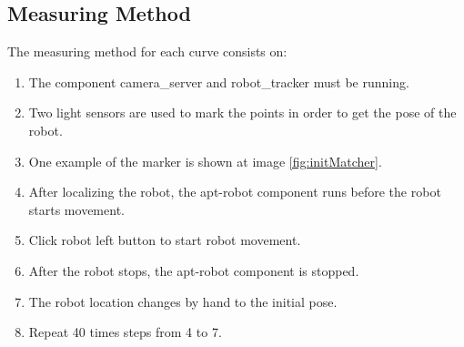\documentclass[10pt]{scrartcl}
\begin{document}
\subsection*{Measuring Method}

The measuring method for each curve consists on:
\begin{enumerate}
	\item The component camera\_server and robot\_tracker must be running.
	\item Two light sensors are used to mark the points in order to get the pose of the robot.
	\item One example of the marker is shown at image \ref{fig:initMatcher}.
	\item After localizing the robot, the apt-robot component runs before the robot starts movement.
	\item Click robot left button to start robot movement.
	\item After the robot stops, the apt-robot component is stopped.
	\item The robot location changes by hand to the initial pose.
	\item Repeat 40 times steps from 4 to 7.
\end{enumerate}
\end{document}
